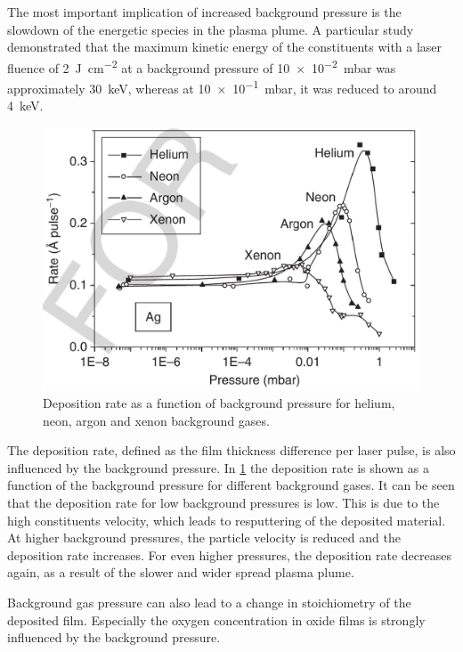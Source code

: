 The most important implication of increased background pressure is the slowdown of 
the energetic species in the plasma plume. 
A particular study demonstrated that the maximum kinetic energy of the constituents
with a laser fluence of \qty{2}{\joule \per \centi \meter \squared} at a background 
pressure of \qty{10e-2}{\milli \bar} was approximately \qty{30}{\kilo \electronvolt}, 
whereas at \qty{10e-1}{\milli \bar}, it was reduced to around 
\qty{4}{\kilo \electronvolt}.

\begin{figure}
	\centering
	\includegraphics[width=0.98\columnwidth]{../assets/deposition_rate.png}
	\caption{Deposition rate as a function of background pressure for helium, neon, 
	argon and xenon background gases.}
	\label{fig:pld_plasma}
\end{figure}

The deposition rate, defined as the film thickness difference per laser pulse, is also 
influenced by the background pressure.
In \cref{fig:pld_plasma} the deposition rate is shown as a function of the background
pressure for different background gases.
It can be seen that the deposition rate for low background pressures is low.
This is due to the high constituents velocity, which leads to resputtering of the
deposited material.
At higher background pressures, the particle velocity is reduced and the deposition
rate increases.
For even higher pressures, the deposition rate decreases again, 
as a result of the slower and wider spread plasma plume.

Background gas pressure can also lead to a change in stoichiometry of the deposited 
film.
Especially the oxygen concentration in oxide films is strongly influenced by the
background pressure.

